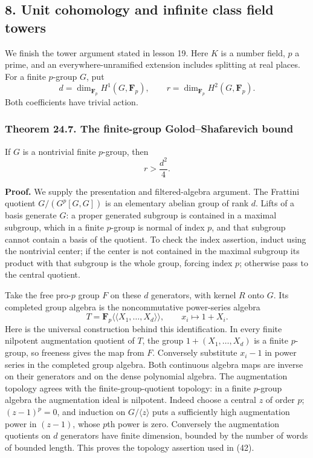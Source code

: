\documentclass[11pt,a4paper]{article}
\begin{document}
\subsection{8. Unit cohomology and infinite class field
towers}\label{unit-cohomology-and-infinite-class-field-towers}

We finish the tower argument stated in lesson 19. Here \(K\) is a number
field, \(p\) a prime, and an everywhere-unramified extension includes
splitting at real places. For a finite \(p\)-group \(G\), put \[
d=\dim_{\mathbf F_p}H^1(G,\mathbf F_p),\qquad
r=\dim_{\mathbf F_p}H^2(G,\mathbf F_p).
\tag{40}
\] Both coefficients have trivial action.

\subsubsection{Theorem 24.7. The finite-group Golod--Shafarevich
bound}\label{theorem-24.7.-the-finite-group-golodshafarevich-bound}

If \(G\) is a nontrivial finite \(p\)-group, then \[
r>\frac{d^2}{4}.
\tag{41}
\]

\textbf{Proof.} We supply the presentation and filtered-algebra
argument. The Frattini quotient \(G/(G^p[G,G])\) is an elementary
abelian group of rank \(d\). Lifts of a basis generate \(G\): a proper
generated subgroup is contained in a maximal subgroup, which in a finite
\(p\)-group is normal of index \(p\), and that subgroup cannot contain a
basis of the quotient. To check the index assertion, induct using the
nontrivial center; if the center is not contained in the maximal
subgroup its product with that subgroup is the whole group, forcing
index \(p\); otherwise pass to the central quotient.

Take the free pro-\(p\) group \(F\) on these \(d\) generators, with
kernel \(R\) onto \(G\). Its completed group algebra is the
noncommutative power-series algebra \[
T=\mathbf F_p\langle\!\langle X_1,\ldots,X_d\rangle\!\rangle,
\qquad x_i\longmapsto1+X_i.
\tag{42}
\] Here is the universal construction behind this identification. In
every finite nilpotent augmentation quotient of \(T\), the group
\(1+(X_1,\ldots,X_d)\) is a finite \(p\)-group, so freeness gives the
map from \(F\). Conversely substitute \(x_i-1\) in power series in the
completed group algebra. Both continuous algebra maps are inverse on
their generators and on the dense polynomial algebra. The augmentation
topology agrees with the finite-group-quotient topology: in a finite
\(p\)-group algebra the augmentation ideal is nilpotent. Indeed choose a
central \(z\) of order \(p\); \((z-1)^p=0\), and induction on
\(G/\langle z\rangle\) puts a sufficiently high augmentation power in
\((z-1)\), whose \(p\)th power is zero. Conversely the augmentation
quotients on \(d\) generators have finite dimension, bounded by the
number of words of bounded length. This proves the topology assertion
used in (42).
\end{document}
